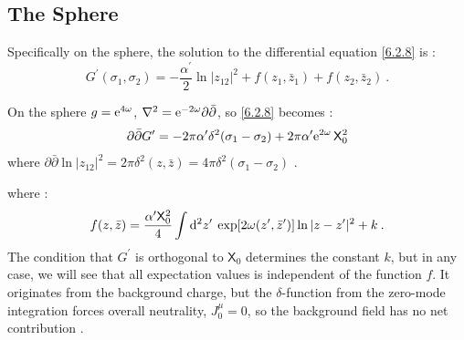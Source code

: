 \subsection*{The Sphere}
Specifically on the sphere, the solution to the differential equation \eqref{6.2.8} is :
\begin{equation}
	G^{\prime}(\sigma_{1}, \sigma_{2})=-\frac{\alpha^{\prime}}{2} \ln |z_{12}|^{2}+f(z_{1}, \bar{z}_{1})+f(z_{2}, \bar{z}_{2}) \:. \label{6.2.9}
\end{equation}
\begin{tcolorbox}
	\begin{remark}
		On the sphere $g=\mathrm{e}^{4 \omega}$, $\nabla^{2}=\mathrm{e}^{-2 \omega} \partial \bar{\partial}$, so \eqref{6.2.8} becomes :
		\[
		\partial \bar{\partial} G^{\prime}=-2 \pi \alpha^{\prime} \delta^{2}(\sigma_{1}-\sigma_{2})
		+2 \pi \alpha^{\prime} \mathrm{e}^{2 \omega}\,\mathsf{X}_{0}^{2} 
		\]
		where $\partial \bar{\partial} \ln |z_{12}|^{2}=2 \pi \delta^{2}(z, \bar{z})=4 \pi \delta^{2}(\sigma_{1}-\sigma_{2})$ .
	\end{remark}
\end{tcolorbox}
\noindent where :
\begin{equation}
	f(z, \bar{z})=\frac{\alpha^{\prime} \mathsf{X}_{0}^{2}}{4} 
	\int \mathrm{d}^{2} z^{\prime}\: \exp [2 \omega(z^{\prime}, \bar{z}^{\prime})] \ln|z-z^{\prime}|^{2}+k \:. \label{6.2.10}
\end{equation}
The condition that $G^{\prime}$ is orthogonal to $\mathsf{X}_{0}$ determines the constant $k$, but in any case, we will see that all expectation values is independent of the function $f$. It originates from the background charge, but the $\delta$-function from the zero-mode integration forces overall neutrality, $J_{0}^{\mu}=0$, so the background field has no net contribution .

